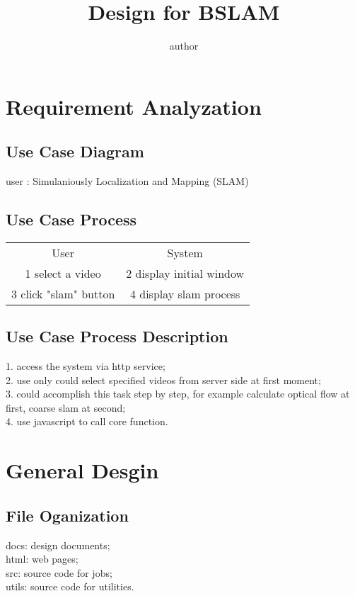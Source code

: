 \documentclass{article}
\title { Design for BSLAM }
\author{author}
\begin{document}
\maketitle


\section{Requirement Analyzation}

\subsection{Use Case Diagram}

user : Simulaniously Localization and Mapping (SLAM)

\subsection{Use Case Process}

\begin{tabular}{c c}

User&System\\
1 select a video & 2 display initial window\\
3 click "slam" button & 4 display slam process\\
\end{tabular}

\subsection{Use Case Process Description}
1. access the system via http service;\\
2. use only could select specified videos from server side at first moment;\\
3. could accomplish this task step by step, for example calculate optical flow at first, coarse slam at second;\\
4. use javascript to call core function.

\section{General Desgin}

\subsection{File Oganization}
docs: design documents;\\
html: web pages; \\
src: source code for jobs;\\
utils: source code for utilities.
\end{document}
